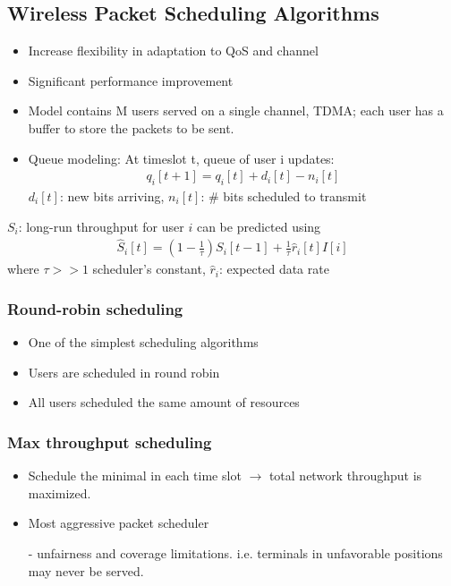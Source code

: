 \subsection{Wireless Packet Scheduling Algorithms}
\begin{itemize}
	\item Increase flexibility in adaptation to QoS and channel
	\item Significant performance improvement
	\item Model contains M users served on a single channel, TDMA; each user has a buffer to store the packets to be sent.
	\item Queue modeling: At timeslot t, queue of user i updates: 
	\begin{align*}
		q_i[t+1] = q_i[t] + d_i[t] - n_i[t]
	\end{align*}
	$d_i[t]$: new bits arriving, $n_i[t]$: \# bits scheduled to transmit
\end{itemize}
$S_i$: long-run throughput for user $i$ can be predicted using
\begin{align*}
	\hat{S}_i[t] = (1 - \frac{1}{\tau}) S_i[t - 1] + \frac{1}{\tau} \hat{r}_i[t]I[i]
\end{align*}
where $\tau >> 1$ scheduler's constant, $\hat{r}_i$: expected data rate
\subsubsection{Round-robin scheduling}
\begin{itemize}
	\item One of the simplest scheduling algorithms
	\item Users are scheduled in round robin
	\item All users scheduled the same amount of resources
\end{itemize}
\subsubsection{Max throughput scheduling}
\begin{itemize}
	\item Schedule the minimal in each time slot $\rightarrow$ total network throughput is maximized.
	\item Most aggressive packet scheduler 
	\item[-] unfairness and coverage limitations. i.e. terminals in unfavorable positions may never be served.
\end{itemize}
